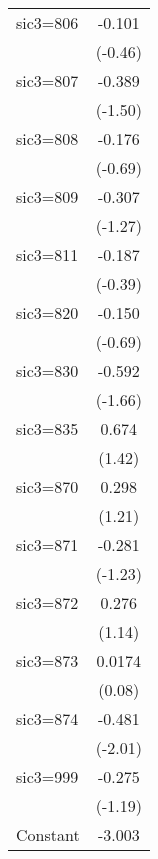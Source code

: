 \begin{table}[htbp]
\begin{tabular*}{0.8\hsize}{@{\hskip\tabcolsep\extracolsep\fill}l*{1}{c}}
\addlinespace
sic3=806            &      -0.101         \\
                    &     (-0.46)         \\
\addlinespace
sic3=807            &      -0.389         \\
                    &     (-1.50)         \\
\addlinespace
sic3=808            &      -0.176         \\
                    &     (-0.69)         \\
\addlinespace
sic3=809            &      -0.307         \\
                    &     (-1.27)         \\
\addlinespace
sic3=811            &      -0.187         \\
                    &     (-0.39)         \\
\addlinespace
sic3=820            &      -0.150         \\
                    &     (-0.69)         \\
\addlinespace
sic3=830            &      -0.592         \\
                    &     (-1.66)         \\
\addlinespace
sic3=835            &       0.674         \\
                    &      (1.42)         \\
\addlinespace
sic3=870            &       0.298         \\
                    &      (1.21)         \\
\addlinespace
sic3=871            &      -0.281         \\
                    &     (-1.23)         \\
\addlinespace
sic3=872            &       0.276         \\
                    &      (1.14)         \\
\addlinespace
sic3=873            &      0.0174         \\
                    &      (0.08)         \\
\addlinespace
sic3=874            &      -0.481\sym{*}  \\
                    &     (-2.01)         \\
\addlinespace
sic3=999            &      -0.275         \\
                    &     (-1.19)         \\
\addlinespace
Constant            &      -3.003\sym{***}\\

\end{tabular*}
\end{table}
